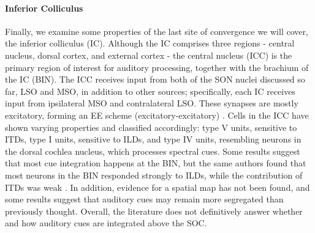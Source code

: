 \documentclass[11pt,a4paper]{article}
\begin{document}
\paragraph{Inferior Colliculus}\label{sec:ic-theory}
Finally, we examine some properties of the last site of convergence we will cover, the inferior colliculus (IC). Although the IC comprises three regions - central nucleus, dorsal cortex, and external cortex - the central nucleus (ICC) is the primary region of interest for auditory processing, together with the brachium of the IC (BIN). The ICC receives input from both of the SON nuclei discussed so far, LSO and MSO, in addition to other sources; specifically, each IC receives input from ipsilateral MSO and contralateral LSO. These synapses are mostly excitatory, forming an EE scheme (excitatory-excitatory) \cite{grotheMechanismsSoundLocalization2010}. Cells in the ICC have shown varying properties and classified accordingly: type V units, sensitive to ITDs, type I units, sensitive to ILDs, and type IV units, resembling neurons in the dorsal cochlea nucleus, which processes spectral cues. Some results \cite{sleeAlignmentSoundLocalization2014} suggest that most cue integration happens at the BIN, but the same authors found that most neurons in the BIN responded strongly to ILDs, while the contribution of ITDs was weak \cite{sleeLinearProcessingInteraural2013}.
In addition, evidence for a spatial map has not been found, and some results \cite{seshagiriResponsePropertiesNeighboring2007} suggest that auditory cues may remain more segregated than previously thought. Overall, the literature does not definitively answer whether and how auditory cues are integrated above the SOC.

\newpage
\end{document}
